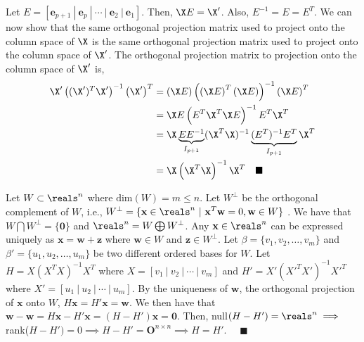 \documentclass[12pt]{article}
\begin{document}
\begin{enumerate}
\begin{tcolorbox}[colback = white, sharp corners]

Let $E = [ \mathbf{e}_{p+1}~|~\mathbf{e}_p~|~ \cdots ~|~\mathbf{e}_2~|~\mathbf{e}_1 ]$. Then, $\X E = \X'$. Also, $E^{-1} = E = E^T$. 
We can now show that the same orthogonal projection matrix used to project onto the column space of $\X$ is the same orthogonal projection matrix used to project onto the column space of $\X'$.
The orthogonal projection matrix to projection onto the column space of $\X'$ is, 
\begin{align*}
\X' \left((\X')^T \X' \right)^{-1} \left(\X' \right)^T &= (\X E) \left( \left( \X E\right)^T \left(\X E \right) \right)^{-1} \left( \X E \right)^T\\
&= \X E \left( E^T \X^T \X E \right)^{-1} E^T \X^T \\
&= \X \underbrace{E E^{-1}}_{I_{p+1}} (\X^T \X)^{-1} \underbrace{(E^T)^{-1} E^T}_{I_{p+1}} \X^T \\
&= \X \left( \X^T \X \right)^{-1} \X^T \quad \blacksquare
\end{align*}

\end{tcolorbox}


\begin{tcolorbox}[colback = white, sharp corners]

Let $W \subset \reals^n$ where $\text{dim}(W) = m \leq n.$
Let $W^{\perp}$ be the orthogonal complement of $W$, i.e., $W^{\perp} = \lbrace \mathbf{x} \in \reals^n  ~\vert~ \mathbf{x}^T\mathbf{w} = 0, \medskip \mathbf{w} \in W \rbrace$ . We have that $W \bigcap W^{\perp} = \lbrace \mathbf{0} \rbrace$ and $\reals^n = W \bigoplus W^{\perp}$. Any $\mathbf{x} \in \reals^n$ can be expressed uniquely as $\mathbf{x} = \mathbf{w} + \mathbf{z}$ where $\mathbf{w} \in W$ and $\mathbf{z} \in W^{\perp}$. Let $\beta = \lbrace v_1, v_2, \ldots, v_m \rbrace $  and $\beta' = \lbrace u_1, u_2, \ldots, u_m \rbrace $ be two different ordered bases for $W$. Let $H = X(X^T X)^{-1}X^T$ where $X = [v_1 ~|~v_2~|~ \cdots ~|~v_m ]$ and $H' = X'(X'^T X')^{-1}X'^T $ where $X' = [u_1 ~|~u_2~|~ \cdots ~|~u_m ]$. By the uniqueness of $\mathbf{w}$, the orthogonal projection of $\mathbf{x}$ onto $W$, $H\mathbf{x} = H'\mathbf{x} = \mathbf{w}.$ We then have that $\mathbf{w} - \mathbf{w} = H\mathbf{x} - H'\mathbf{x} = (H - H')\mathbf{x} = \mathbf{0}$. Then,  null$(H-H') = \reals^n \implies$  rank($H - H') = 0 \implies H - H' = \mathbf{O}^{n \times n}  \implies H = H'$. $\quad \blacksquare$ 
\end{tcolorbox}


\end{enumerate}
\end{document}
